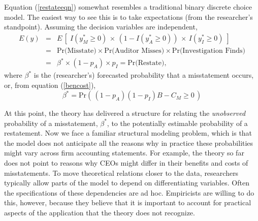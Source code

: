 \documentclass[12pt,reqno,titlepage]{amsart}
\theoremstyle{definition}
\begin{document}
\begin{doublespace}
Equation (\ref{restateeqn}) somewhat resembles a traditional binary discrete choice model. The easiest
way to see this is to take expectations (from the researcher's standpoint).
Assuming the decision variables are independent,
\begin{equation} \label{equilpr}
\begin{array}{lcl}
 E(y) & = & E\, \left[\; I(y^*_M \ge 0) \, \times\, (1 - I(y^*_A \ge 0)) \, \times\, I(y^*_I \ge 0) \; \right]\\[1em]
 & = &  \mbox{Pr(Misstate)} \times \mbox{Pr(Auditor Misses)} \times
\mbox{Pr(Investigation Finds)}\\[1em]
& = & \beta^* \times (1-p_A) \times p_{I} = \mbox{Pr(Restate)} ,
\end{array}\end{equation}
where $\beta^*$ is the (researcher's) forecasted probability that a misstatement occurs, or, from equation (\ref{bencost}),
\begin{equation}\label{betaplus}
\beta^*= \mbox{Pr}\left(\, (1 - p_A)(1 - p_I) B - C_M \ge 0 \,\right)
\end{equation}

At this point, the theory has delivered a structure for relating the \emph{unobserved} probability of a misstatement, $\beta^*$, to the potentially estimable probability of a restatement.
Now we face a familiar structural modeling problem, which is that the model does not anticipate all the reasons why in practice these probabilities might vary across firm accounting statements.
For example, the theory so far does not point to reasons why CEOs might differ in their benefits and costs of misstatements. 
To move theoretical relations closer to the data, researchers typically allow parts of the model to depend on differentiating variables.
Often the specifications of these dependencies are ad hoc. 
Empiricists are willing to do this, however, because they believe that it is important to account for practical aspects of the application that the theory does not recognize.


\end{doublespace}
\end{document}
